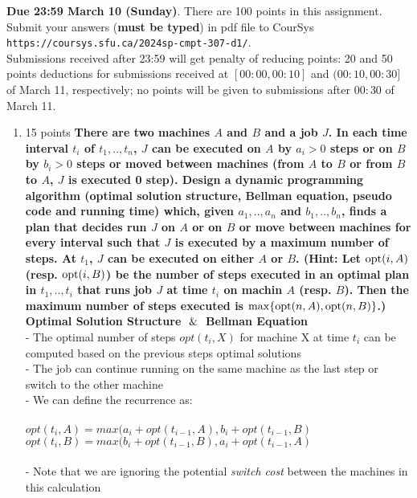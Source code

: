 \documentclass[letterpaper,12pt]{article}
\newcommand{\opt}{{\mathop{\rm opt}}}
\begin{document}

\pagestyle{myheadings}

\noindent
{\bf Due 23:59 March 10 (Sunday)}. There are 100 points in this assignment. 
Submit your answers ({\bf must be typed}) in pdf file to CourSys\\
{\tt https://coursys.sfu.ca/2024sp-cmpt-307-d1/}.\\
Submissions received after 23:59 will get penalty of reducing points: 20 and 50 points
deductions for submissions received at $[00:00,00:10]$ and $(00:10,00:30]$ of March 11,
respectively; no points will be given to submissions after $00:30$ of March 11.
 
\begin{enumerate}
\item 15 points 
\textbf{There are two machines $A$ and $B$ and a job $J$. In each time interval $t_i$ of
$t_1,..,t_n$, $J$ can be executed on $A$ by $a_i>0$ steps or on $B$ by $b_i>0$
steps or moved between machines (from $A$ to $B$ or from $B$ to $A$, $J$ is
executed 0 step). Design a dynamic programming algorithm (optimal solution structure,
Bellman equation, pseudo code and running time) which, given $a_1,..,a_n$ and $b_1,..,b_n$, 
finds a plan that decides run $J$ on $A$ or on $B$ or move between machines for every 
interval such that $J$ is executed by a maximum number of steps. At $t_1$, $J$ can be 
executed on either $A$ or $B$. (Hint: Let $\opt(i,A)$ (resp. $\opt(i,B)$) be the number of 
steps executed in an optimal plan in $t_1,..,t_i$ that runs job $J$ at time $t_i$ on machin 
$A$ (resp. $B$). Then the maximum number of steps executed is $\max\{\opt(n,A),\opt(n,B)\}$.)} \\

\textbf{Optimal Solution Structure $\And$ Bellman Equation} \\
- The optimal number of steps $opt(t_i, X)$ for machine X at time $t_i$ can be computed based on the previous steps optimal solutions \\
- The job can continue running on the same machine as the last step or switch to the other machine \\
- We can define the recurrence as: \\ \\
\(opt(t_i, A) = max(a_i + opt(t_{i-1}, A), b_i + opt(t_{i-1}, B)\) \\
\(opt(t_i, B) = max(b_i + opt(t_{i-1}, B), a_i + opt(t_{i-1}, A)\) \\ \\
- Note that we are ignoring the potential \textit{switch cost} between the machines in this calculation \\


\end{enumerate}
\end{document}
